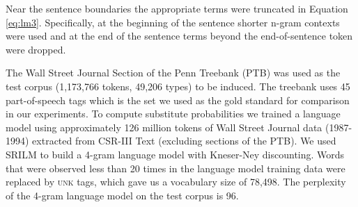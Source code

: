 Near the sentence boundaries the appropriate terms were truncated in
Equation \ref{eq:lm3}.  Specifically, at the beginning of the sentence
shorter n-gram contexts were used and at the end of the sentence terms
beyond the end-of-sentence token were dropped.  


The Wall Street Journal Section of the Penn Treebank (PTB) \cite{treebank3}
was used as the test corpus (1,173,766 tokens, 49,206 types) to be
induced.
The treebank uses 45 part-of-speech tags which is the set we used as
the gold standard for comparison in our experiments.
To compute substitute probabilities we trained a language model using
approximately 126 million tokens of Wall Street Journal data
(1987-1994) extracted from CSR-III Text \cite{csr3text} (excluding
sections of the PTB).
We used SRILM \cite{Stolcke2002} to build a 4-gram language model with
Kneser-Ney discounting.
Words that were observed less than 20 times in the language model
training data were replaced by \textsc{unk} tags, which gave us a
vocabulary size of 78,498.
The perplexity of the 4-gram language model on the test corpus is 96.
